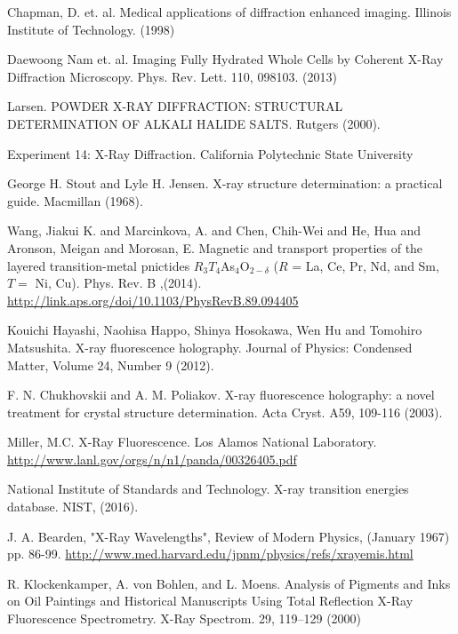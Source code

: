\documentclass[%
 reprint,
 amsmath,amssymb,
 aps,
 pra,
]{revtex4-1}
\begin{document}
\begin{thebibliography}{6}
	 Chapman, D. et. al. Medical applications of diffraction enhanced imaging. Illinois Institute of Technology. (1998)
	 
	 Daewoong Nam et. al. Imaging Fully Hydrated Whole Cells by Coherent X-Ray Diffraction Microscopy. Phys. Rev. Lett. 110, 098103. (2013)
	 
	 Larsen. POWDER X-RAY DIFFRACTION: STRUCTURAL DETERMINATION OF ALKALI HALIDE SALTS. Rutgers (2000).
	 
	 Experiment 14: X-Ray Diffraction. California Polytechnic State University 
	 
	 George H. Stout and Lyle H. Jensen. X-ray structure determination: a practical guide. Macmillan (1968).
	 
	 Wang, Jiakui K. and Marcinkova, A. and Chen, Chih-Wei and He, Hua and Aronson, Meigan and Morosan, E. Magnetic and transport properties of the layered transition-metal pnictides ${R}_{3}{T}_{4}$As${}_{4}$O${}_{2\ensuremath{-}\ensuremath{\delta}}$ ($R$ = La, Ce, Pr, Nd, and Sm, $T=$ Ni, Cu). Phys. Rev. B ,(2014). \url{http://link.aps.org/doi/10.1103/PhysRevB.89.094405}
	 
	 Kouichi Hayashi, Naohisa Happo, Shinya Hosokawa, Wen Hu and Tomohiro Matsushita. X-ray fluorescence holography. Journal of Physics: Condensed Matter, Volume 24, Number 9 (2012).
	 
	 F. N. Chukhovskii and A. M. Poliakov. X-ray fluorescence holography: a novel treatment for crystal structure determination. Acta Cryst. A59, 109-116 (2003).
	 
	 Miller, M.C. X-Ray Fluorescence. Los Alamos National Laboratory. \url{http://www.lanl.gov/orgs/n/n1/panda/00326405.pdf}
	 
	 National Institute of Standards and Technology. X-ray transition energies database. NIST, (2016).
	 
	 J. A. Bearden, "X-Ray Wavelengths", Review of Modern Physics, (January 1967) pp. 86-99. \url{http://www.med.harvard.edu/jpnm/physics/refs/xrayemis.html}

	R. Klockenkamper, A. von Bohlen, and L. Moens. Analysis of Pigments and Inks on Oil Paintings and Historical Manuscripts Using Total Reflection X-Ray Fluorescence Spectrometry. X-Ray Spectrom. 29, 119–129 (2000)
	

\end{thebibliography}
\end{document}
